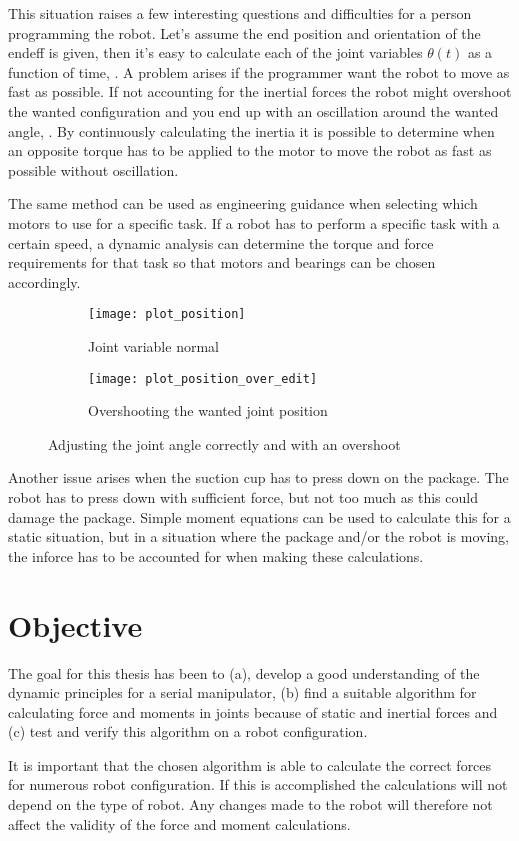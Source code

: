 This situation raises a few interesting questions and difficulties for a person programming the robot. Let's assume the end position and orientation of the \gls{endeff} is given, then it's easy to calculate each of the joint variables $\theta (t)$ as a function of time, . A problem arises if the programmer want the robot to move as fast as possible. If not accounting for the inertial forces the robot might overshoot the wanted configuration and you end up with an oscillation around the wanted angle, . By continuously calculating the inertia it is possible to determine when an opposite torque has to be applied to the motor to move the robot as fast as possible without oscillation.

The same method can be used as engineering guidance when selecting which motors to use for a specific task. If a robot has to perform a specific task with a certain speed, a dynamic analysis can determine the torque and force requirements for that task so that motors and bearings can be chosen accordingly.

\begin{figure}[ht!]
\begin{subfigure}{0.5\textwidth}
    \centering
    \texttt{[image: plot\_position]}
    \caption{Joint variable normal}
    \label{plot_position}
\end{subfigure}
\hfill
\begin{subfigure}{0.5\textwidth}
    \centering
    \texttt{[image: plot\_position\_over\_edit]}
    \caption{Overshooting the wanted joint position}
    \label{plot_position_over}
\end{subfigure}
\caption{Adjusting the joint angle correctly and with an overshoot}
\label{joint_position}
\end{figure}

Another issue arises when the suction cup has to press down on the package. The robot has to press down with sufficient force, but not too much as this could damage the package. Simple moment equations can be used to calculate this for a static situation, but in a situation where the package and/or the robot is moving, the \gls{inforce} has to be accounted for when making these calculations.

\section{Objective}

The goal for this thesis has been to (a), develop a good understanding of the dynamic principles for a serial manipulator, (b) find a suitable algorithm for calculating force and moments in joints because of static and inertial forces and (c) test and verify this algorithm on a robot configuration.

It is important that the chosen algorithm is able to calculate the correct forces for numerous robot configuration. If this is accomplished the calculations will not depend on the type of robot. Any changes made to the robot will therefore not affect the validity of the force and moment calculations.
